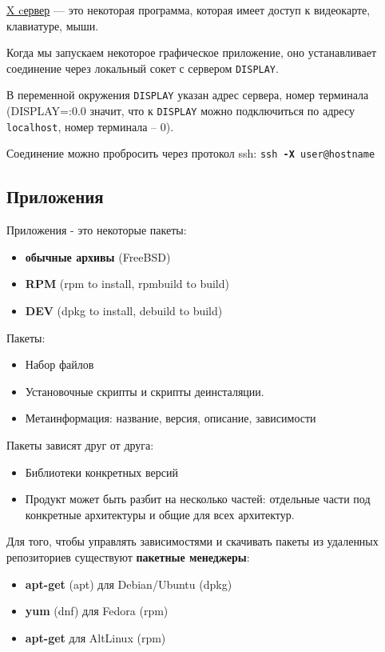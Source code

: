 \begin{Def}
	\underline{X cервер} --- это некоторая программа, которая имеет доступ к видеокарте, клавиатуре, мыши.
\end{Def}

Когда мы запускаем некоторое графическое приложение, оно устанавливает соединение через локальный сокет с сервером \texttt{DISPLAY}. 

В переменной окружения \texttt{DISPLAY} указан адрес сервера, номер терминала (DISPLAY=:0.0 значит, что к \texttt{DISPLAY} можно подключиться по адресу \texttt{localhost}, номер терминала -- 0).

Соединение можно пробросить через протокол ssh:
\texttt{ssh \textbf{-X} user@hostname}

\subsection{Приложения}

Приложения - это некоторые пакеты:
\begin{itemize}
	\item \textbf{обычные архивы} (FreeBSD)
	\item \textbf{RPM} (rpm to install, rpmbuild to build)
	\item \textbf{DEV} (dpkg to install, debuild to build)
\end{itemize}

Пакеты:
\begin{itemize}
	\item Набор файлов
	\item {Установочные} скрипты и скрипты {деинсталяции}.
	\item {Метаинформация}: название, версия, описание, {зависимости}
\end{itemize}

Пакеты зависят друг от друга:
\begin{itemize}
	\item {Библиотеки конкретных версий}
	\item Продукт может быть разбит на {несколько частей}: отдельные части под конкретные архитектуры и общие для всех архитектур.
\end{itemize}

Для того, чтобы управлять зависимостями и скачивать пакеты из удаленных репозиториев существуют \textbf{пакетные менеджеры}:
\begin{itemize}
	\item \textbf{apt-get} (apt) для Debian/Ubuntu (dpkg)
	\item \textbf{yum} (dnf) для Fedora (rpm)
	\item \textbf{apt-get} для AltLinux (rpm)
\end{itemize}

